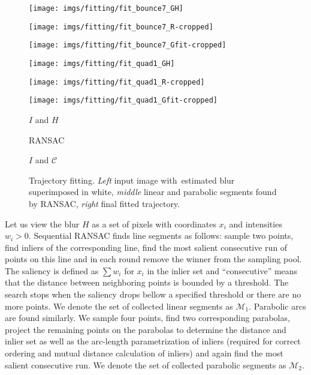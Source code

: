 \documentclass[10pt,twocolumn,letterpaper]{article}
\begin{document}
\begin{figure}
	\noindent\begin{minipage}[t]{.33\linewidth}
		\centering
		\texttt{[image: imgs/fitting/fit\_bounce7\_GH]}
	\end{minipage}\hfill \begin{minipage}[t]{.33\linewidth}
		\centering
		\texttt{[image: imgs/fitting/fit\_bounce7\_R-cropped]}
	\end{minipage}\hfill \begin{minipage}[t]{.33\linewidth}
		\centering
		\texttt{[image: imgs/fitting/fit\_bounce7\_Gfit-cropped]}
	\end{minipage}
\begin{minipage}[t]{.33\linewidth}
		\centering
		\texttt{[image: imgs/fitting/fit\_quad1\_GH]}
	\end{minipage}\hfill \begin{minipage}[t]{.33\linewidth}
		\centering
		\texttt{[image: imgs/fitting/fit\_quad1\_R-cropped]}
	\end{minipage}\hfill \begin{minipage}[t]{.33\linewidth}
		\centering
		\texttt{[image: imgs/fitting/fit\_quad1\_Gfit-cropped]}
	\end{minipage}
\begin{minipage}[t]{.33\linewidth}
		\centering
		$I$ and $H$
	\end{minipage}\hfill \begin{minipage}[t]{.33\linewidth}
		\centering
		RANSAC
	\end{minipage}\hfill \begin{minipage}[t]{.33\linewidth}
		\centering
		$I$ and $\mathcal{C}$
	\end{minipage}
	\caption{Trajectory fitting. \emph{Left} input image with~estima\-ted blur superimposed in white, \emph{middle} linear and parabolic segments found by RANSAC, \emph{right} final fitted \mbox{trajectory.}}
	\label{fig:fitting}
\end{figure} 
Let us view the blur $H$ as a set of pixels with coordinates $x_i$ and intensities $w_i>0$. Sequential RANSAC finds line segments as follows: sample two points, find inliers of the corresponding line, find the most salient consecutive run of points on this line and in each round remove the winner from the sampling pool.
The saliency is defined as $\sum w_i$ for $x_i$ in the inlier set and ``consecutive'' means that the distance between neighboring points is bounded by a threshold.
The search stops when the saliency drops bellow a specified threshold or there are no more points.
We denote the set of collected linear segments as $\mathcal{M}_1$. Parabolic arcs are found similarly. We sample four points, find two corresponding parabolas, project the remaining points on the parabolas to determine the distance and inlier set as well as the arc-length parametrization of inliers (required for correct ordering and mutual distance calculation of inliers) and again find the most salient consecutive run. 
We denote the set of collected parabolic segments as $\mathcal{M}_2$.
\end{document}
